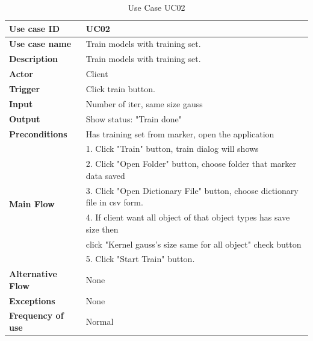 \begin{table}[H]
  \begin{center}
    \begin{tabular}{ | l | l | } 
    \hline
    \textbf{Use case ID} & UC02 \\
    \hline
    \textbf{Use case name} & Train models with training set. \\
    \hline
    \textbf{Description} & Train models with training set.\\
    \hline
    \textbf{Actor} & Client \\
    \hline
    \textbf{Trigger} & Click train button. \\
    \hline
    \textbf{Input} & Number of iter, same size gauss \\
    \hline
    \textbf{Output} & Show status: "Train done" \\
    \hline    
    \textbf{Preconditions} & Has training set from marker, open the application \\
    \hline
    \multirow{6}{4em}{\textbf{Main Flow}}  & 1. Click "Train" button, train dialog will shows \\
    & 2. Click "Open Folder" button, choose folder that marker data saved \\
    & 3. Click "Open Dictionary File" button, choose dictionary file in csv form. \\
    & 4. If client want all object of that object types has save size then \\
    & click "Kernel gauss's size same for all object" check button  \\
    & 5. Click "Start Train" button. \\
    \hline
    \textbf{Alternative Flow} & None \\
    \hline
    \textbf{Exceptions} & None \\
    \hline
    \textbf{Frequency of use} & Normal \\
    \hline
    \end{tabular}
  \end{center}
  \caption{Use Case UC02}\label{tab:uc2}
\end{table}


